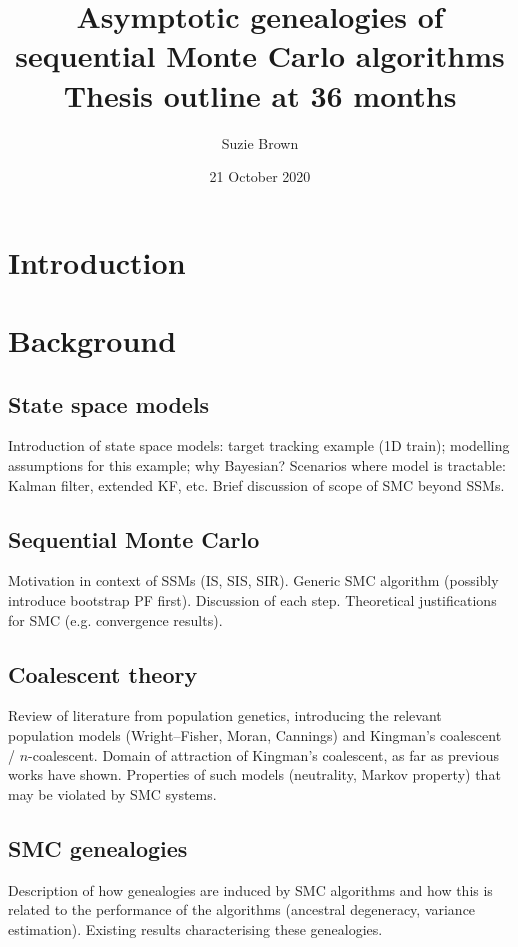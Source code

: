 \documentclass{article}
\title{Asymptotic genealogies of sequential Monte Carlo algorithms\\Thesis outline at 36 months}
\author{Suzie Brown}
\date{21 October 2020}
\begin{document}
\maketitle

\section{Introduction}

\section{Background}
\subsection{State space models}
Introduction of state space models: target tracking example (1D train); modelling assumptions for this example; why Bayesian?
Scenarios where model is tractable: Kalman filter, extended KF, etc.
Brief discussion of scope of SMC beyond SSMs.
\subsection{Sequential Monte Carlo}
Motivation in context of SSMs (IS, SIS, SIR). Generic SMC algorithm (possibly introduce bootstrap PF first). Discussion of each step.
Theoretical justifications for SMC (e.g. convergence results).
\subsection{Coalescent theory}
Review of literature from population genetics, introducing the relevant population models (Wright--Fisher, Moran, Cannings) and Kingman's coalescent / $n$-coalescent. Domain of attraction of Kingman's coalescent, as far as previous works have shown. Properties of such models (neutrality, Markov property) that may be violated by SMC systems.
\subsection{SMC genealogies}
Description of how genealogies are induced by SMC algorithms and how this is related to the performance of the algorithms (ancestral degeneracy, variance estimation). Existing results characterising these genealogies.
\end{document}
